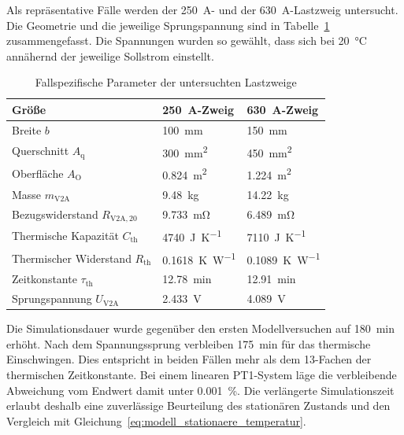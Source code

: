 Als repräsentative Fälle werden der \SI{250}{\ampere}- und der
\SI{630}{\ampere}-Lastzweig untersucht. Die Geometrie und die jeweilige
Sprungspannung sind in Tabelle~\ref{tab:modell_fallspezifische_parameter}
zusammengefasst. Die Spannungen wurden so gewählt, dass sich bei
\SI{20}{\degreeCelsius} annähernd der jeweilige Sollstrom einstellt.

\begin{table}[H]
    \centering
    \small
    \caption{Fallspezifische Parameter der untersuchten Lastzweige}
    \label{tab:modell_fallspezifische_parameter}
    \begin{tabular}{p{}
                    >{\centering\arraybackslash}p{}
                    >{\centering\arraybackslash}p{}}
        \toprule
        Größe & \SI{250}{\ampere}-Zweig & \SI{630}{\ampere}-Zweig \\
        \midrule
        Breite \(b\) & \SI{100}{\milli\metre} & \SI{150}{\milli\metre} \\
        Querschnitt \(A_{\mathrm{q}}\) & \SI{300}{\milli\metre\squared} & \SI{450}{\milli\metre\squared} \\
        Oberfläche \(A_{\mathrm{O}}\) & \SI{0.824}{\metre\squared} & \SI{1.224}{\metre\squared} \\
        Masse \(m_{\mathrm{V2A}}\) & \SI{9.48}{\kilogram} & \SI{14.22}{\kilogram} \\
        Bezugswiderstand \(R_{\mathrm{V2A},20}\) & \SI{9.733}{\milli\ohm} & \SI{6.489}{\milli\ohm} \\
        Thermische Kapazität \(C_{\mathrm{th}}\) & \SI{4740}{\joule\per\kelvin} & \SI{7110}{\joule\per\kelvin} \\
        Thermischer Widerstand \(R_{\mathrm{th}}\) & \SI{0.1618}{\kelvin\per\watt} & \SI{0.1089}{\kelvin\per\watt} \\
        Zeitkonstante \(\tau_{\mathrm{th}}\) & \SI{12.78}{\minute} & \SI{12.91}{\minute} \\
        Sprungspannung \(U_{\mathrm{V2A}}\) & \SI{2.433}{\volt} & \SI{4.089}{\volt} \\
        \bottomrule
    \end{tabular}
\end{table}

Die Simulationsdauer wurde gegenüber den ersten Modellversuchen auf
\SI{180}{\minute} erhöht. Nach dem Spannungssprung verbleiben
\SI{175}{\minute} für das thermische Einschwingen. Dies entspricht in beiden
Fällen mehr als dem 13-Fachen der thermischen Zeitkonstante. Bei einem linearen
PT1-System läge die verbleibende Abweichung vom Endwert damit unter
\SI{0.001}{\percent}. Die verlängerte Simulationszeit erlaubt deshalb eine
zuverlässige Beurteilung des stationären Zustands und den Vergleich mit
Gleichung~\eqref{eq:modell_stationaere_temperatur}.


